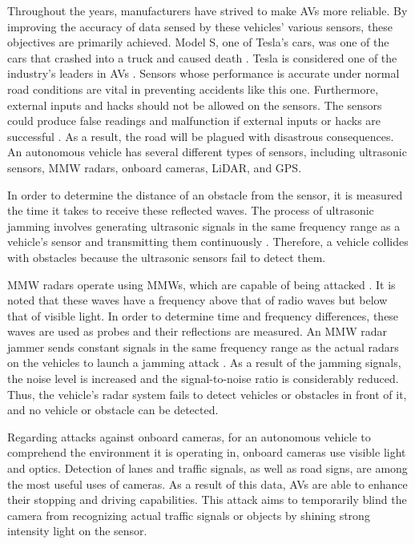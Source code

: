 \documentclass[a4paper,12pt]{article}
\begin{document}
\hspace{5mm} Throughout the years, manufacturers have strived to make AVs more reliable. By improving the accuracy of data sensed by these vehicles' various sensors, these objectives are primarily achieved. Model S, one of Tesla's cars, was one of the cars that crashed into a truck and caused death \cite{article21}. Tesla is considered one of the industry's leaders in AVs \cite{article21}. Sensors whose performance is accurate under normal road conditions are vital in preventing accidents like this one. Furthermore, external inputs and hacks should not be allowed on the sensors. The sensors could produce false readings and malfunction if external inputs or hacks are successful \cite{article21}. As a result, the road will be plagued with disastrous consequences. An autonomous vehicle has several different types of sensors, including ultrasonic sensors, MMW radars, onboard cameras, LiDAR, and GPS.

\hspace{5mm} In order to determine the distance of an obstacle from the sensor, it is measured the time it takes to receive these reflected waves. The process of ultrasonic jamming involves generating ultrasonic signals in the same frequency range as a vehicle's sensor and transmitting them continuously \cite{article21}. Therefore, a vehicle collides with obstacles because the ultrasonic sensors fail to detect them.

\hspace{5mm} MMW radars operate using MMWs, which are capable of being attacked \cite{article21}. It is noted that these waves have a frequency above that of radio waves but below that of visible light. In order to determine time and frequency differences, these waves are used as probes and their reflections are measured. An MMW radar jammer sends constant signals in the same frequency range as the actual radars on the vehicles to launch a jamming attack \cite{article21}. As a result of the jamming signals, the noise level is increased and the signal-to-noise ratio is considerably reduced. Thus, the vehicle's radar system fails to detect vehicles or obstacles in front of it, and no vehicle or obstacle can be detected.

\hspace{5mm} Regarding attacks against onboard cameras, for an autonomous vehicle to comprehend the environment it is operating in, onboard cameras use visible light and optics. Detection of lanes and traffic signals, as well as road signs, are among the most useful uses of cameras. As a result of this data, AVs are able to enhance their stopping and driving capabilities. This attack aims to temporarily blind the camera from recognizing actual traffic signals or objects by shining strong intensity light on the sensor.
\end{document}

